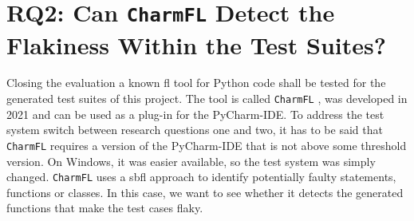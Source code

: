 \documentclass[
fancyheadings, %
%
%
]{stsreprt}
\begin{document}
\section{RQ2: Can \texttt{CharmFL} Detect the Flakiness Within the Test Suites?}
Closing the evaluation a known \acrshort{fl} tool for Python code shall be tested for the generated test suites of this project. 
The tool is called \texttt{CharmFL} \cite{charmfl:2021}, was developed in 2021 and can be used as a plug-in for the PyCharm-IDE.
To address the test system switch between research questions one and two, it has to be said that \texttt{CharmFL} requires a version of the PyCharm-IDE that is not above some threshold version. On Windows, it was easier available, so the test system was simply changed. \texttt{CharmFL} uses a \acrlong{sbfl} approach to identify potentially faulty statements, functions or classes. In this case, we want to see whether it detects the generated functions that make the test cases flaky. 
\end{document}
